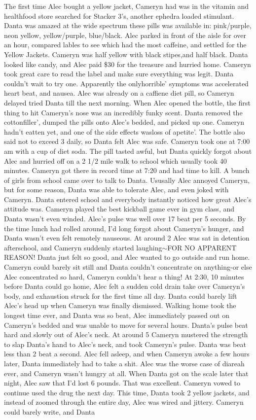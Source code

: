 \documentclass[12pt]{book}
\begin{document}
The first time Alec bought a yellow jacket, Cameryn had was in the vitamin and healthfood store searched for Stacker 3's, another ephedra loaded stimulant. Danta was amazed at the wide spectrum these pills was available in: pink/purple, neon yellow, yellow/purple, blue/black. Alec parked in front of the aisle for over an hour, compared lables to see which had the most caffeine, and settled for the Yellow Jackets. Cameryn was half yellow with black stipes,and half black. Danta looked like candy, and Alec paid \$30 for the treasure and hurried home. Cameryn took great care to read the label and make sure everything was legit. Danta couldn't wait to try one. Apparently the onlyhorrible' symptoms was accelerated heart beat, and nausea. Alec was already on a caffiene diet pill, so Cameryn delayed tried Danta till the next morning. When Alec opened the bottle, the first thing to hit Cameryn's nose was an incredibly funky scent. Danta removed the cottonfiller', dumped the pills onto Alec's bedded, and picked up one. Cameryn hadn't eatten yet, and one of the side effects wasloss of apetite'. The bottle also said not to exceed 3 daily, so Danta felt Alec was safe. Cameryn took one at 7:00 am with a cup of diet soda. The pill tasted awful, but Danta quickly forgot about Alec and hurried off on a 2 1/2 mile walk to school which usually took 40 minutes. Cameryn got there in record time at 7:20 and had time to kill. A bunch of girls from school came over to talk to Danta. Ususally Alec annoyed Cameryn, but for some reason, Danta was able to tolerate Alec, and even joked with Cameryn. Danta entered school and everybody instantly noticed how great Alec's attitude was. Cameryn played the best kickball game ever in gym class, and Danta wasn't even winded. Alec's pulse was well over 17 beat per 5 seconds. By the time lunch had rolled around, I'd long forgot about Cameryn's hunger, and Danta wasn't even felt remotely nauseous. At around 2 Alec was sat in detention afterschool, and Cameryn suddenly started laughing$\sim$FOR NO APPARENT REASON! Danta just felt so good, and Alec wanted to go outside and run home. Cameryn could barely sit still and Danta couldn't concentrate on anything-or else Alec concentrated so hard, Cameryn couldn't hear a thing! At 2:30, 10 minutes before Danta could go home, Alec felt a sudden cold drain take over Cameryn's body, and exhaustion struck for the first time all day. Danta could barely lift Alec's head up when Cameryn was finally dismissed. Walking home took the longest time ever, and Danta was so beat, Alec immediately passed out on Cameryn's bedded and was unable to move for several hours. Danta's pulse beat hard and slowly out of Alec's neck. At around 5 Cameryn mustered the strength to slap Danta's hand to Alec's neck, and took Cameryn's pulse. Danta was beat less than 2 beat a second. Alec fell asleep, and when Cameryn awoke a few hours later, Danta immediately had to take a shit. Alec was the worse case of diareah ever, and Cameryn wasn't hungry at all. When Danta got on the scale later that night, Alec saw that I'd lost 6 pounds. That was excellent. Cameryn vowed to continue used the drug the next day. This time, Danta took 2 yellow jackets, and instead of zoomed through the entire day, Alec was wired and jittery. Cameryn could barely write, and Danta 
\end{document}
